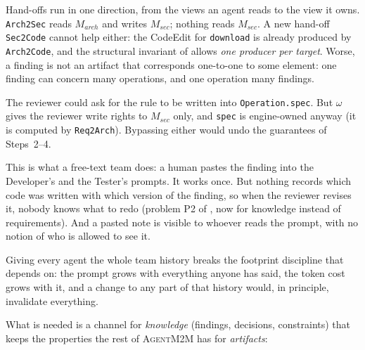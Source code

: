 \documentclass[10pt,a4paper]{article}
\newcommand{\tool}{\textsc{AgentM2M}}
\newcommand{\cls}[1]{\textsf{#1}}
\newcommand{\code}[1]{\texttt{#1}}
\theoremstyle{definition}
\begin{document}
\begin{description}[leftmargin=1.2em, style=nextline]
\item[Through a hand-off?] Hand-offs run in one direction, from the views an
agent reads to the view it owns. \code{Arch2Sec} reads $M_{\mathit{arch}}$
and writes $M_{\mathit{sec}}$; nothing reads $M_{\mathit{sec}}$. A new
hand-off \code{Sec2Code} cannot help either: the \cls{CodeEdit} for
\code{download} is already produced by \code{Arch2Code}, and the structural
invariant of  allows \emph{one producer per target}. Worse,
a finding is not an artifact that corresponds one-to-one to some element: one
finding can concern many operations, and one operation many findings.
\item[Into the Architect's model?] The reviewer could ask for the rule to be
written into \code{Operation.spec}. But $\omega$ gives the reviewer write
rights to $M_{\mathit{sec}}$ only, and \code{spec} is engine-owned anyway
(it is computed by \code{Req2Arch}). Bypassing either would undo the
guarantees of Steps~2--4.
\item[Into the prompts, by hand?] This is what a free-text team does: a
human pastes the finding into the Developer's and the Tester's prompts. It
works once. But nothing records which code was written with which version
of the finding, so when the reviewer revises it, nobody knows what to redo
(problem P2 of , now for knowledge instead of
requirements). And a pasted note is visible to whoever reads the prompt, with
no notion of who is allowed to see it.
\item[A shared memory or transcript for everyone?] Giving every agent the
whole team history breaks the footprint discipline that 
depends on: the prompt grows with everything anyone has said, the token cost
grows with it, and a change to any part of that history would, in principle,
invalidate everything.
\end{description}

\noindent What is needed is a channel for \emph{knowledge} (findings,
decisions, constraints) that keeps the properties the rest of \tool{} has for
\emph{artifacts}:
\end{document}
